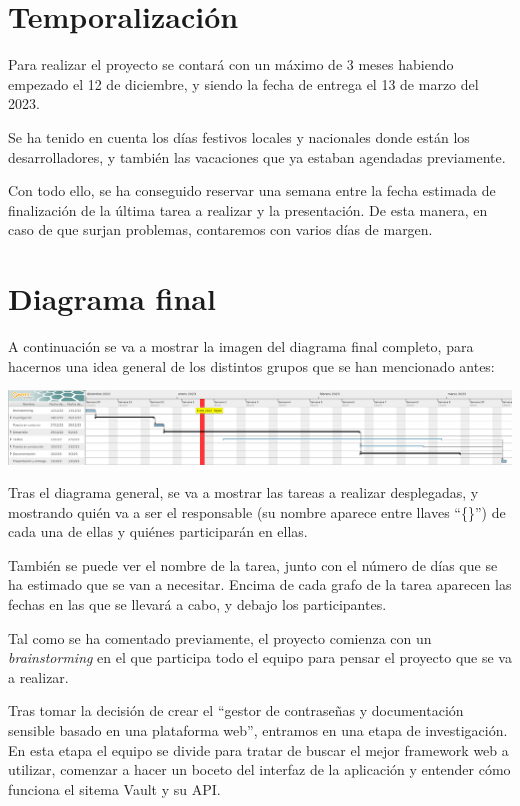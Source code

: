 \documentclass{\ClassPath/viu-tfm-template}
\begin{document}
\section{Temporalización}
Para realizar el proyecto se contará con un máximo de 3 meses habiendo empezado el 12 de diciembre, y siendo la fecha de entrega el 13 de marzo del 2023.

Se ha tenido en cuenta los días festivos locales y nacionales donde están los desarrolladores, y también las vacaciones que ya estaban agendadas previamente.

Con todo ello, se ha conseguido reservar una semana entre la fecha estimada de finalización de la última tarea a realizar y la presentación. De esta manera, en caso de que surjan problemas, contaremos con varios días de margen.

\section{Diagrama final}

A continuación se va a mostrar la imagen del diagrama final completo, para hacernos una idea general de los distintos grupos que se han mencionado antes:

\begin{center}
    \includegraphics[frame,width=\linewidth]{img/diagrama.png}
\end{center}


Tras el diagrama general, se va a mostrar las tareas a realizar desplegadas, y mostrando quién va a ser el responsable (su nombre aparece entre llaves “\{\}”) de cada una de ellas y quiénes participarán en ellas.

También se puede ver el nombre de la tarea, junto con el número de días que se ha estimado que se van a necesitar. Encima de cada grafo de la tarea aparecen las fechas en las que se llevará a cabo, y debajo los participantes.

Tal como se ha comentado previamente, el proyecto comienza con un \textit{brainstorming} en el que participa todo el equipo para pensar el proyecto que se va a realizar.

Tras tomar la decisión de crear el “gestor de contraseñas y documentación sensible basado en una plataforma web”, entramos en una etapa de investigación. En esta etapa el equipo se divide para tratar de buscar el mejor framework web a utilizar, comenzar a hacer un boceto del interfaz de la aplicación y entender cómo funciona el sitema Vault y su API.
\end{document}
